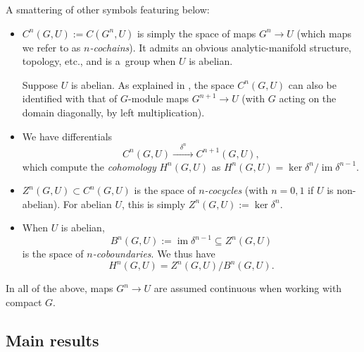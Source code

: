 \documentclass[10pt,a4paper]{amsart}
\numberwithin{equation}{section}
\DeclareMathOperator{\im}{\mathrm{im}}
\begin{document}
A smattering of other symbols featuring below:
\begin{itemize}\itemsep=0pt
\item $C^n(G,U):=C(G^n,U)$ is simply the space of maps $G^n\to U$ (which maps we refer to as {\it $n$-cochains}). It admits an obvious analytic-manifold structure, topology, etc., and is a~group when $U$ is abelian.

 Suppose $U$ is abelian. As explained in \cite[Section~VII.3]{ser-lf}, the space $C^n(G,U)$ can also be identified with that of $G$-module maps $G^{n+1}\to U$ (with $G$ acting on the domain diagonally, by left multiplication).
\item We have differentials
\[C^n(G,U)\xrightarrow{\quad\delta^n\quad}C^{n+1}(G,U),\] which compute the {\it cohomology} $H^n(G,U)$ as $
 H^n(G,U) = \ker \delta^n/\im \delta^{n-1}$.

\item $Z^n(G,U)\subset C^n(G,U)$ is the space of {\it $n$-cocycles} (with $n=0,1$ if $U$ is non-abelian). For abelian $U$, this is simply $Z^n(G,U):=\ker \delta^n$.
\item When $U$ is abelian,
 \begin{equation*}
 B^n(G,U):=\im\delta^{n-1}\subseteq Z^n(G,U)
 \end{equation*}
 is the space of {\it $n$-coboundaries}. We thus have
 \begin{equation*}
 H^n(G,U) = Z^n(G,U)/B^n(G,U).
 \end{equation*}
\end{itemize}
In all of the above, maps $G^n\to U$ are assumed continuous when working with compact $G$.

\subsection{Main results}\label{subse:gpmain}
\end{document}
